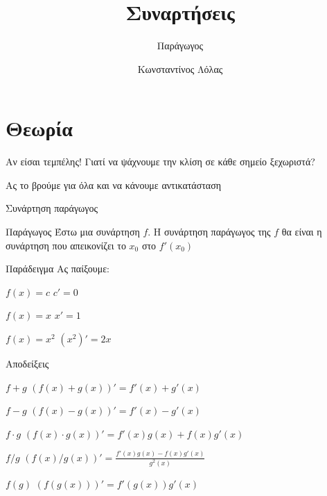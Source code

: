 \documentclass[greek]{beamer}
\title{Συναρτήσεις}
\subtitle{Παράγωγος}
\author[Λόλας]{Κωνσταντίνος Λόλας}
\date{}
\begin{document}
\begin{frame}
 \titlepage
\end{frame}

\section{Θεωρία}
\begin{frame}{Αν είσαι τεμπέλης!}
 Γιατί να ψάχνουμε την κλίση σε κάθε σημείο ξεχωριστά? \pause

 Ας το βρούμε για όλα και να κάνουμε αντικατάσταση
\end{frame}

\begin{frame}{Συνάρτηση παράγωγος}
 \begin{block}{Παράγωγος}
  Έστω μια συνάρτηση $f$. Η συνάρτηση παράγωγος της $f$ θα είναι η συνάρτηση που απεικονίζει το $x_0$ στο $f'(x_0)$
 \end{block}
\end{frame}

\begin{frame}{Παράδειγμα}
 Ας παίξουμε:
 \begin{block}{$f(x)=c$}
  $c'=0$
 \end{block} \pause

 \begin{block}{$f(x)=x$}
  $x'=1$
 \end{block} \pause

 \begin{block}{$f(x)=x^2$}
  $(x^2)'=2x$
 \end{block}
\end{frame}

\begin{frame}{Αποδείξεις}
 \begin{block}{$f+g$}
  $(f(x)+g(x))'=f'(x)+g'(x)$
 \end{block} \pause

 \begin{block}{$f-g$}
  $(f(x)-g(x))'=f'(x)-g'(x)$
 \end{block} \pause

 \begin{block}{$f\cdot g$}
  $(f(x)\cdot g(x))'=f'(x)g(x)+f(x)g'(x)$
 \end{block} \pause

 \begin{block}{$f/g$}
  $(f(x)/g(x))'=\frac{f'(x)g(x)-f(x)g'(x)}{g^2(x)}$
 \end{block} \pause

 \begin{block}{$f(g)$}
  $(f(g(x)))'=f'(g(x))g'(x)$
 \end{block}
\end{frame}
\end{document}
